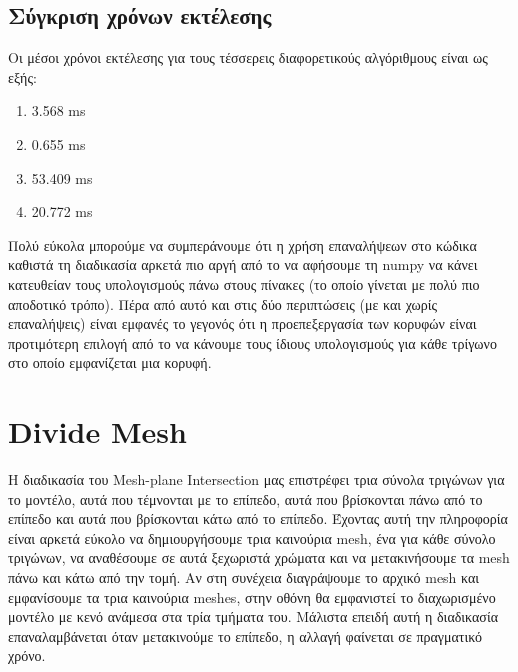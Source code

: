 \documentclass{article}
\begin{document}
\subsection{Σύγκριση χρόνων εκτέλεσης}
Οι μέσοι χρόνοι εκτέλεσης για τους τέσσερεις διαφορετικούς αλγόριθμους είναι ως εξής:

\begin{enumerate}
	\item 3.568 ms
	\item 0.655 ms
	\item 53.409 ms
	\item 20.772 ms
\end{enumerate}

Πολύ εύκολα μπορούμε να συμπεράνουμε ότι η χρήση επαναλήψεων στο κώδικα καθιστά τη
διαδικασία αρκετά πιο αργή από το να αφήσουμε τη numpy να κάνει κατευθείαν τους
υπολογισμούς πάνω στους πίνακες (το οποίο γίνεται με πολύ πιο αποδοτικό τρόπο).
Πέρα από αυτό και στις δύο περιπτώσεις (με και χωρίς επαναλήψεις) είναι εμφανές το
γεγονός ότι η προεπεξεργασία των κορυφών είναι προτιμότερη επιλογή από το να κάνουμε τους
ίδιους υπολογισμούς για κάθε τρίγωνο στο οποίο εμφανίζεται μια κορυφή.


\section{Divide Mesh}
Η διαδικασία του Mesh-plane Intersection μας επιστρέφει τρια σύνολα τριγώνων για το
μοντέλο, αυτά που τέμνονται με το επίπεδο, αυτά που βρίσκονται πάνω από το επίπεδο και
αυτά που βρίσκονται κάτω από το επίπεδο. Έχοντας αυτή την πληροφορία είναι αρκετά εύκολο
να δημιουργήσουμε τρια καινούρια mesh, ένα για κάθε σύνολο τριγώνων, να αναθέσουμε σε
αυτά ξεχωριστά χρώματα και να μετακινήσουμε τα mesh πάνω και κάτω από την τομή.
Αν στη συνέχεια διαγράψουμε το αρχικό mesh και εμφανίσουμε τα τρια καινούρια meshes, στην
οθόνη θα εμφανιστεί το διαχωρισμένο μοντέλο με κενό ανάμεσα στα τρία τμήματα του. Μάλιστα
επειδή αυτή η διαδικασία επαναλαμβάνεται όταν μετακινούμε το επίπεδο, η αλλαγή φαίνεται
σε πραγματικό χρόνο.
\end{document}
